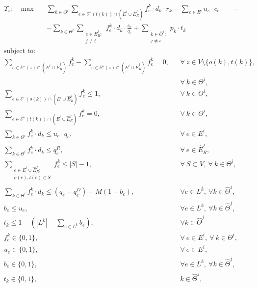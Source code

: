 \documentclass{article}
\begin{document}
    \begin{align}
        &  \Upsilon_i: \hspace{10pt} \max  &&  \sum_{k\in \Theta^i} \sum_{e \in \delta^-(t(k))\cap (E^i\cup \widehat{E}_R^j)} f_e^k \cdot d_k \cdot r_k - \sum_{e\in E^i} u_e\cdot c_e \hspace{20pt} -  \nonumber  \label{eq:IterativeA}\\
        & 								  && - \sum_{k \in \Theta^i} \sum_{\substack{e \in \widehat{E}_R^j\colon \\ j\not = i}} f_e^k \cdot d_k \cdot \frac{c_e}{q_e}   + \sum_{\substack{k \in \widehat{\Theta}^j \colon \\j\not = i}} p_k \cdot t_k
    \end{align}
    \begin{align}
        & \text{subject to:}       && \nonumber\\
& \sum_{e \in \delta^-(z)\cap (E^i\cup \widehat{E}_R^j)} f_e^k-\sum_{e \in \delta^+(z)\cap (E^i\cup \widehat{E}_R^j)} f_{e}^k  = 0,                                   && \forall\ z\in V\setminus\{o(k),t(k)\},\nonumber\\[-1em]
& && \forall\ k\in\Theta^i,  \label{eq:IterativeB}\\[1em]
& \sum_{e \in \delta^+(o(k))\cap (E^i\cup \widehat{E}_R^j)} f_e^k  \leq 1, && \forall\ k\in \Theta^i, \label{eq:IterativeC} \\
& \sum_{e \in \delta^+(t(k))\cap (E^i\cup \widehat{E}_R^j)} f_e^k  = 0,  && \forall\ k\in \Theta^i, \label{eq:IterativeD} \\
& \sum_{k \in \Theta^i} f_e^k\cdot d_k \leq u_e\cdot q_e, && \forall\ e \in E^i, \label{eq:IterativeE}  \\
& \sum_{k \in \Theta^i} f_e^k\cdot d_k \leq  q_e^R, && \forall\ e \in \widehat{E}_R^j,\label{eq:IterativeF}  \\
& \sum_{\substack{e \in E^i\cup \widehat{E}_R^j\colon \\ o(e),t(e) \in S}}  f_e^k  \leq |S| -1, && \forall\ S \subset V,\ \forall\ k \in \Theta^i, \label{eq:IterativeG}\\
&\sum_{k\in \Theta^i} f_e^k \cdot d_k \leq (q_e - q_e^D) +M(1-b_e),\quad && \forall e \in L^{\bar{k}},\ \forall \bar{k} \in \widehat{\Theta}^j, \label{eq:IterativeH}\\
&b_e \leq u_e, && \forall e\in L^k,\ \forall k \in \widehat{\Theta}^j, \label{eq:IterativeI}\\[5pt]
& t_k \leq 1 -  (|L^k|-\sum_{e \in L^k} b_e), && \forall k \in \widehat{\Theta}^j \label{eq:IterativeJ}\\
& f_e^k  \in \{0,1\}, && \forall\ e \in E^i,\ \forall\ k \in \Theta^i, \label{eq:IterativeK} \\
&  u_e   \in \{0,1\},   && \forall\ e \in E^i,  \label{eq:IterativeL}\\
& b_e \in \{0,1\}, && \forall e \in L^k,\ \forall k\in \widehat{\Theta}^j,\label{eq:IterativeM}\\
& t_k \in \{0,1\}, && k \in \widehat{\Theta}^j, \label{eq:IterativeN}
    \end{align}
\end{document}
